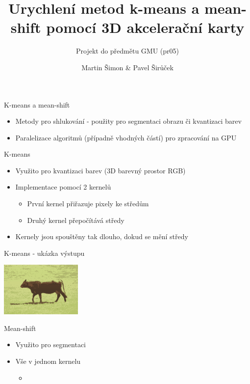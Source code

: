 \documentclass{beamer}
\title{Urychlení metod k-means a mean-shift pomocí 3D akcelerační karty}
\subtitle{Projekt do předmětu GMU (pr05)}
\author[Martin Šimon \& Pavel Širůček]{Martin Šimon \& Pavel Širůček}
\institute{Vysoké učení technické v Brně - Fakulta informačních technologií}
\date{}
\begin{document}
\begin{frame}[plain]
  \titlepage 
\end{frame}
\addtocounter{framenumber}{-1}


\begin{frame}{K-means a mean-shift}
  \begin{itemize}
    \medskip
    \item Metody pro shlukování - použity pro segmentaci obrazu či kvantizaci barev
    \medskip
    \item Paralelizace algoritmů (případně vhodných částí) pro zpracování na GPU
    \medskip
  \end{itemize}
\end{frame}


\begin{frame}{K-means}
  \begin{itemize}
    \item Využito pro kvantizaci barev (3D barevný prostor RGB)
    \medskip
    \item Implementace pomocí 2 kernelů
    \medskip
      \begin{itemize}
        \item První kernel přiřazuje pixely ke středům
        \medskip
        \item Druhý kernel přepočítává středy
        \medskip
      \end{itemize}
    \item Kernely jsou spouštěny tak dlouho, dokud se mění středy
    \medskip
  \end{itemize}
\end{frame}


\begin{frame}{K-means - ukázka výstupu}
  \begin{center}
    \includegraphics[width=4cm,keepaspectratio]{images/km.pdf}
  \end{center}
\end{frame}


\begin{frame}{Mean-shift}
  \begin{itemize}
    \item Využito pro segmentaci
    \medskip
    \item Vše v jednom kernelu
    \medskip
      \begin{itemize}
        \item
      \end{itemize}
    \medskip
  \end{itemize}
\end{frame}
\end{document}
